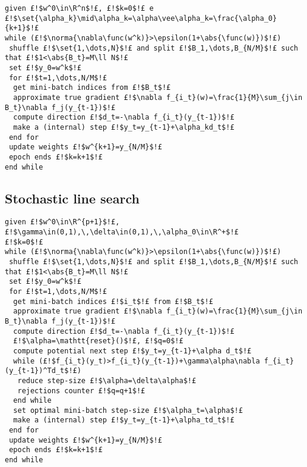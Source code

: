 \begin{lstlisting}[style=simple,caption={Mini-batch Gradient Descent with fixed or decreasing step-size},label=code:MiniGD-fix-decr]
given £!$w^0\in\R^n$!£, £!$k=0$!£ e £!$\set{\alpha_k}\mid\alpha_k=\alpha\vee\alpha_k=\frac{\alpha_0}{k+1}$!£
while (£!$\norma{\nabla\func(w^k)}>\epsilon(1+\abs{\func(w)})$!£)
 shuffle £!$\set{1,\dots,N}$!£ and split £!$B_1,\dots,B_{N/M}$!£ such that £!$1<\abs{B_t}=M\ll N$!£
 set £!$y_0=w^k$!£
 for £!$t=1,\dots,N/M$!£
  get mini-batch indices from £!$B_t$!£
  approximate true gradient £!$\nabla f_{i_t}(w)=\frac{1}{M}\sum_{j\in B_t}\nabla f_j(y_{t-1})$!£
  compute direction £!$d_t=-\nabla f_{i_t}(y_{t-1})$!£
  make a (internal) step £!$y_t=y_{t-1}+\alpha_kd_t$!£
 end for
 update weights £!$w^{k+1}=y_{N/M}$!£
 epoch ends £!$k=k+1$!£
end while
\end{lstlisting}


\subsection{Stochastic line search}

\begin{lstlisting}[style=simple,caption={Mini-batch Gradient Descent with Armijo line search}]
given £!$w^0\in\R^{p+1}$!£, £!$\gamma\in(0,1),\,\delta\in(0,1),\,\alpha_0\in\R^+$!£
£!$k=0$!£
while (£!$\norma{\nabla\func(w^k)}>\epsilon(1+\abs{\func(w)})$!£)
 shuffle £!$\set{1,\dots,N}$!£ and split £!$B_1,\dots,B_{N/M}$!£ such that £!$1<\abs{B_t}=M\ll N$!£
 set £!$y_0=w^k$!£
 for £!$t=1,\dots,N/M$!£
  get mini-batch indices £!$i_t$!£ from £!$B_t$!£
  approximate true gradient £!$\nabla f_{i_t}(w)=\frac{1}{M}\sum_{j\in B_t}\nabla f_j(y_{t-1})$!£
  compute direction £!$d_t=-\nabla f_{i_t}(y_{t-1})$!£
  £!$\alpha=\mathtt{reset}()$!£, £!$q=0$!£
  compute potential next step £!$y_t=y_{t-1}+\alpha d_t$!£
  while (£!$f_{i_t}(y_t)>f_{i_t}(y_{t-1})+\gamma\alpha\nabla f_{i_t}(y_{t-1})^Td_t$!£)
   reduce step-size £!$\alpha=\delta\alpha$!£
   rejections counter £!$q=q+1$!£
  end while
  set optimal mini-batch step-size £!$\alpha_t=\alpha$!£
  make a (internal) step £!$y_t=y_{t-1}+\alpha_td_t$!£
 end for
 update weights £!$w^{k+1}=y_{N/M}$!£
 epoch ends £!$k=k+1$!£
end while
\end{lstlisting}

